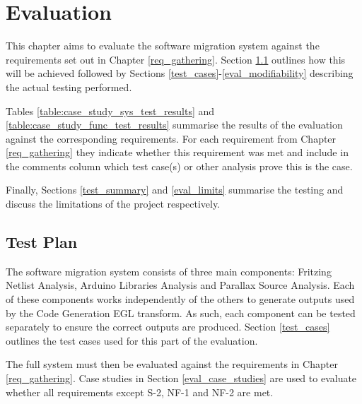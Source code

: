 \documentclass{UoYCSproject}
\begin{document}



\chapter{Evaluation}
This chapter aims to evaluate the software migration system against the requirements set out in Chapter \ref{req_gathering}. Section \ref{test_plan} outlines how this will be achieved followed by Sections \ref{test_cases}-\ref{eval_modifiability} describing the actual testing performed.

Tables \ref{table:case_study_sys_test_results} and \ref{table:case_study_func_test_results} summarise the results of the evaluation against the corresponding requirements. For each requirement from Chapter \ref{req_gathering} they indicate whether this requirement was met and include in the comments column which test case(s) or other analysis prove this is the case.

Finally, Sections \ref{test_summary} and \ref{eval_limits} summarise the testing and discuss the limitations of the project respectively.

\section{Test Plan} \label{test_plan}
The software migration system consists of three main components: Fritzing Netlist Analysis, Arduino Libraries Analysis and Parallax Source Analysis. Each of these components works independently of the others to generate outputs used by the Code Generation EGL transform. As such, each component can be tested separately to ensure the correct outputs are produced. Section \ref{test_cases} outlines the test cases used for this part of the evaluation.

The full system must then be evaluated against the requirements in Chapter \ref{req_gathering}. Case studies in Section \ref{eval_case_studies} are used to evaluate whether all requirements except S-2, NF-1 and NF-2 are met.
\end{document}
